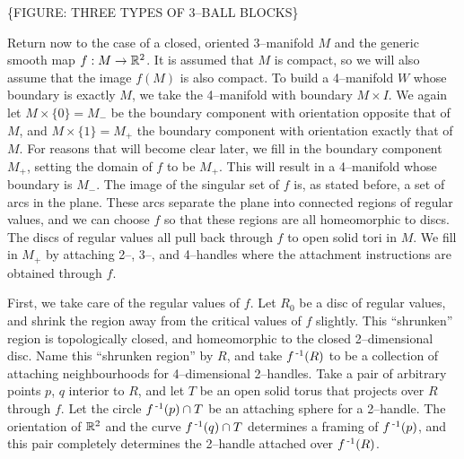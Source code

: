 \{FIGURE: THREE TYPES OF 3--BALL BLOCKS\}

Return now to the case of a closed, oriented 3--manifold $M$ and the generic smooth map $f:M\to \mathbb{R}^2$.
It is assumed that $M$ is compact, so we will also assume that the image $f(M)$ is also compact.
To build a 4--manifold $W$ whose boundary is exactly $M$, we take the 4--manifold with boundary $M\times I$.
We again let $M\times \{0\}=M_-$ be the boundary component with orientation opposite that of $M$, and $M\times\{1\}=M_+$ the boundary component with orientation exactly that of $M$.
For reasons that will become clear later, we fill in the boundary component $M_+$, setting the domain of $f$ to be $M_+$.
This will result in a 4--manifold whose boundary is $M_-$.
The image of the singular set of $f$ is, as stated before, a set of arcs in the plane.
These arcs separate the plane into connected regions of regular values, and we can choose $f$ so that these regions are all homeomorphic to discs.
The discs of regular values all pull back through $f$ to open solid tori in $M$.
We fill in $M_+$ by attaching 2--, 3--, and 4--handles where the attachment instructions are obtained through $f$.

First, we take care of the regular values of $f$.
Let $R_0$ be a disc of regular values, and shrink the region away from the critical values of $f$ slightly.
This ``shrunken'' region is topologically closed, and homeomorphic to the closed 2--dimensional disc.
Name this ``shrunken region'' by $R$, and take $f^{\,\text{-}1} (R)$ to be a collection of attaching neighbourhoods for 4--dimensional 2--handles.
Take a pair of arbitrary points $p$, $q$ interior to $R$, and let $T$ be an open solid torus that projects over $R$ through $f$.
Let the circle $f^{\,\text{-}1} (p)\cap T$ be an attaching sphere for a 2--handle.
The orientation of $\mathbb{R}^2$ and the curve $f^{\,\text{-}1} (q)\cap T$ determines a framing of $f^{\,\text{-}1} (p)$, and this pair completely determines the 2--handle attached over $f^{\,\text{-}1} (R)$.

